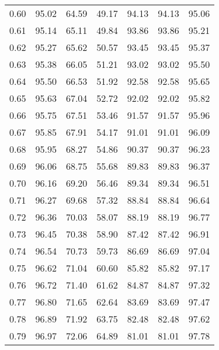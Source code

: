 \begin{tabular}{|c|c|c|c|c|c|c|}
      0.60 &     95.02 &     64.59 &      49.17 &   94.13 &      94.13 &         95.06 \\
      0.61 &     95.14 &     65.11 &      49.84 &   93.86 &      93.86 &         95.21 \\
      0.62 &     95.27 &     65.62 &      50.57 &   93.45 &      93.45 &         95.37 \\
      0.63 &     95.38 &     66.05 &      51.21 &   93.02 &      93.02 &         95.50 \\
      0.64 &     95.50 &     66.53 &      51.92 &   92.58 &      92.58 &         95.65 \\
      0.65 &     95.63 &     67.04 &      52.72 &   92.02 &      92.02 &         95.82 \\
      0.66 &     95.75 &     67.51 &      53.46 &   91.57 &      91.57 &         95.96 \\
      0.67 &     95.85 &     67.91 &      54.17 &   91.01 &      91.01 &         96.09 \\
      0.68 &     95.95 &     68.27 &      54.86 &   90.37 &      90.37 &         96.23 \\
      0.69 &     96.06 &     68.75 &      55.68 &   89.83 &      89.83 &         96.37 \\
      0.70 &     96.16 &     69.20 &      56.46 &   89.34 &      89.34 &         96.51 \\
      0.71 &     96.27 &     69.68 &      57.32 &   88.84 &      88.84 &         96.64 \\
      0.72 &     96.36 &     70.03 &      58.07 &   88.19 &      88.19 &         96.77 \\
      0.73 &     96.45 &     70.38 &      58.90 &   87.42 &      87.42 &         96.91 \\
      0.74 &     96.54 &     70.73 &      59.73 &   86.69 &      86.69 &         97.04 \\
      0.75 &     96.62 &     71.04 &      60.60 &   85.82 &      85.82 &         97.17 \\
      0.76 &     96.72 &     71.40 &      61.62 &   84.87 &      84.87 &         97.32 \\
      0.77 &     96.80 &     71.65 &      62.64 &   83.69 &      83.69 &         97.47 \\
      0.78 &     96.89 &     71.92 &      63.75 &   82.48 &      82.48 &         97.62 \\
      0.79 &     96.97 &     72.06 &      64.89 &   81.01 &      81.01 &         97.78 \\

\end{tabular}
